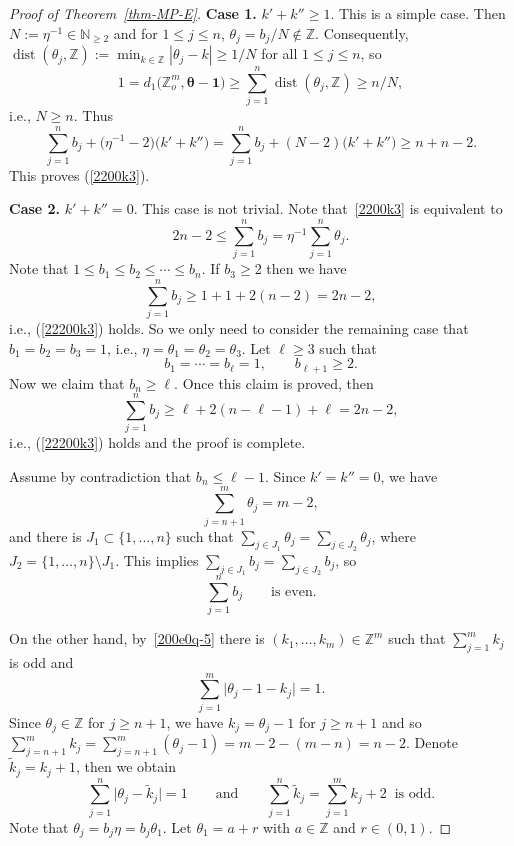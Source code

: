 \documentclass[pdftex]{sigma}
\numberwithin{equation}{section}
\def\Z{\mathbb Z}
\begin{document}
\begin{proof}[Proof of Theorem~\ref{thm-MP-E}]
{\bf Case 1.} $k'+k''\geq 1$. This is a simple case.
Then $N:=\eta^{-1}\in\mathbb{N}_{\geq 2}$ and for $1\leq j\leq n$, $\theta_j=b_j/N\notin\mathbb{Z}$. Consequently,
$\operatorname{dist}(\theta_j,\mathbb{Z}):=\min_{k\in\mathbb{Z}}|\theta_j-k|\geq 1/N$ for all $1\leq j\leq n$, so
\[1=d_1\bigl(\Z_o^{m},{\boldsymbol\theta-\boldsymbol 1}\bigr)\geq\sum_{j=1}^n\operatorname{dist}(\theta_j,\mathbb{Z})\geq n/N,\]
i.e., $N\geq n$. Thus
\[\sum_{j=1}^n b_j+\bigl(\eta^{-1}-2\bigr)\bigl(k'+k''\bigr)=\sum_{j=1}^n b_j+(N-2)\bigl(k'+k''\bigr)\geq n+n-2.\]
This proves (\ref{2200k3}).

{\bf Case 2.} $k'+k''=0$.
This case is not trivial.
Note that~\eqref{2200k3} is equivalent to
\begin{equation}\label{22200k3}2n-2\leq \sum_{j=1}^n b_j=\eta^{-1}\sum_{j=1}^n\theta_j.\end{equation}
Note that $1\leq b_1\leq b_2\leq\cdots\leq b_n$. If $b_3\geq 2$ then we have
\[\sum_{j=1}^n b_j\geq 1+1+2(n-2)=2n-2,\]
i.e., (\ref{22200k3}) holds. So we only need to consider the remaining case that $b_1=b_2=b_3=1$, i.e., $\eta=\theta_1=\theta_2=\theta_3$. Let $\ell\geq 3$ such that
\begin{equation}\label{bbbbb}b_1=\cdots=b_\ell=1,\qquad b_{\ell+1}\geq 2.\end{equation}
Now we claim that $b_n\geq \ell$. Once this claim is proved, then{\samepage
\[\sum_{j=1}^n b_j\geq \ell+2(n-\ell-1)+\ell=2n-2,\]
i.e., (\ref{22200k3}) holds and the proof is complete.}


Assume by contradiction that $b_n\leq \ell-1$.
Since $k'=k''=0$, we have
\[\sum_{j=n+1}^m \theta_{j}=m-2,\]
and there is $J_1\subset\{1,\dots,n\}$ such that $\sum_{j\in
 J_1}\theta_j=\sum_{j\in J_2}\theta_j$, where
$J_2=\{1,\dots,n\}\setminus J_1$. This implies $\sum_{j\in
 J_1}b_j=\sum_{j\in J_2}b_j$,
so
\begin{equation}\label{bbbeee}
\sum_{j=1}^n b_j \qquad \text{is even.}
\end{equation}

On the other hand, by~\eqref{200e0q-5} there is $(k_1,\dots,k_m)\in\mathbb{Z}^m$ such that $\sum_{j=1}^m k_j$ is odd and
\[\sum_{j=1}^m\bigl|\theta_j-1-k_j\bigr|=1.\]
Since $\theta_j\in\mathbb{Z}$ for $j\geq n+1$, we have $k_j=\theta_j-1$ for $j\geq n+1$ and so $\sum_{j=n+1}^m k_j=\sum_{j=n+1}^m (\theta_{j}-1)=m-2-(m-n)=n-2$. Denote $\tilde{k}_j=k_j+1$, then we obtain
\[\sum_{j=1}^n\big|\theta_j-\tilde{k}_j\big|=1\qquad \text{and}\qquad \sum_{j=1}^n \tilde{k}_j=\sum_{j=1}^m k_j+2\;\;\text{is odd}.\]
Note that $\theta_j=b_j\eta=b_j\theta_1$. Let $\theta_1=a+r$ with $a\in \mathbb{Z}$ and $r\in (0,1)$.


\end{proof}
\end{document}
